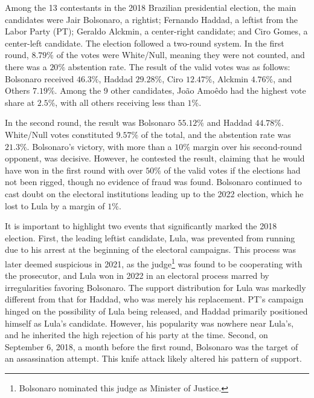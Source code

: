 \documentclass[hidelinks,11pt]{article} \usepackage[utf8]{inputenc}
\begin{document}
Among the 13 contestants in the 2018 Brazilian presidential election, the main
candidates were Jair Bolsonaro, a rightist; Fernando Haddad, a leftist from the
Labor Party (PT); Geraldo Alckmin, a center-right candidate; and Ciro Gomes, a
center-left candidate. The election followed a two-round system. In the first
round, \(8.79\%\) of the votes were White/Null, meaning they were not counted,
and there was a \(20\%\) abstention rate. The result of the valid votes was as
follows: Bolsonaro received \(46.3\%\), Haddad \(29.28\%\), Ciro \(12.47\%\),
Alckmin \(4.76\%\), and Others \(7.19\%\). Among the 9 other candidates, Jo\~ao
Amo\^edo had the highest vote share at \(2.5\%\), with all others receiving less
than \(1\%\).

In the second round, the result was Bolsonaro \(55.12\%\) and Haddad
\(44.78\%\). White/Null votes constituted \(9.57\%\) of the total, and the
abstention rate was \(21.3\%\). Bolsonaro's victory, with more than a \(10\%\)
margin over his second-round opponent, was decisive. However, he contested the
result, claiming that he would have won in the first round with over \(50\%\) of
the valid votes if the elections had not been rigged, though no evidence of fraud was found. Bolsonaro continued to cast doubt on the electoral institutions leading up to the 2022 election, which he lost to Lula by a margin of \(1\%\).


It is important to highlight two events that significantly marked the 2018
election. First, the leading leftist candidate, Lula, was prevented from running
due to his arrest at the beginning of the electoral campaigns. This process was
later deemed suspicious in 2021, as the judge\footnote{Bolsonaro nominated this
  judge as Minister of Justice.} was found to be cooperating with the
prosecutor, and Lula won in 2022 in an electoral process marred by
irregularities favoring Bolsonaro. The support distribution for Lula was
markedly different from that for Haddad, who was merely his replacement. PT's
campaign hinged on the possibility of Lula being released, and Haddad primarily
positioned himself as Lula's candidate. However, his popularity was nowhere near
Lula's, and he inherited the high rejection of his party at the time. Second, on
September 6, 2018, a month before the first round, Bolsonaro was the target of
an assassination attempt. This knife attack likely altered his pattern of
support.
\end{document}

